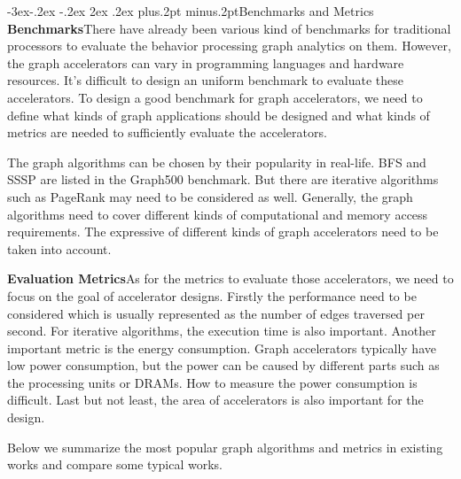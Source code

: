 \documentclass[twoside]{article}
\makeatletter
\def\subsection{\@startsection{subsection}{2}{\z@}%
 {-3ex\@plus -.2ex \@minus -.2ex}%
 {2ex \@plus.2ex}%
{\normalfont\normalsize\protect\baselineskip=12.5pt plus.2pt minus.2pt\bfseries}}
\makeatother
\begin{document}
\begin{multicols}{2}
\subsection{Benchmarks and Metrics}
{\bf Benchmarks}\quad There have already been various kind of benchmarks for traditional processors to evaluate the behavior processing graph analytics on them. However, the graph accelerators can vary in programming languages and hardware resources. It's difficult to design an uniform benchmark to evaluate these accelerators. To design a good benchmark for graph accelerators, we need to define what kinds of graph applications should be designed and what kinds of metrics are needed to sufficiently evaluate the accelerators.

The graph algorithms can be chosen by their popularity in real-life. BFS and SSSP are listed in the Graph500 benchmark. But there are iterative algorithms such as PageRank may need to be considered as well. Generally, the graph algorithms need to cover different kinds of computational and memory access requirements. The expressive of different kinds of graph accelerators need to be taken into account.

{\bf Evaluation Metrics}\quad As for the metrics to evaluate those accelerators, we need to focus on the goal of accelerator designs. Firstly the performance need to be considered which is usually represented as the number of edges traversed per second. For iterative algorithms, the execution time is also important. Another important metric is the energy consumption. Graph accelerators typically have low power consumption, but the power can be caused by different parts such as the processing units or DRAMs. How to measure the power consumption is difficult. Last but not least, the area of accelerators is also important for the design. 

Below we summarize the most popular graph algorithms and metrics in existing works and compare some typical works.



\end{multicols}
\end{document}
